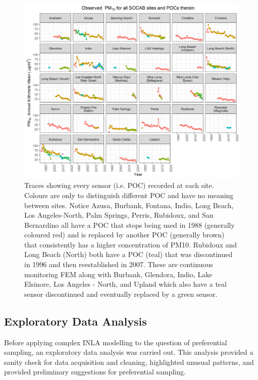\begin{figure}[ht]
\centering
\includegraphics[width = \textwidth]{Figures/POC_all_trace.png}
\caption{Traces showing every sensor (i.e. \ac{POC}) recorded at each site.  Colours are only to distinguish different \ac{POC} and have no meaning between sites.  Notice Azusa, Burbank, Fontana, Indio, Long Beach, Los Angeles-North, Palm Springs, Perris, Rubidoux, and San Bernardino all have a \ac{POC} that stops being used in 1988 (generally coloured red) and is replaced by another \ac{POC} (generally brown) that consistently has a higher concentration of PM10.  Rubidoux and Long Beach (North) both have a \ac{POC} (teal) that was discontinued in 1996 and then reestablished in 2007. These are continuous monitoring \ac{FEM} along with Burbank, Glendora, Indio, Lake Elsinore, Los Angeles - North, and Upland which also have a teal sensor discontinued and eventually replaced by a green sensor.}
\label{fig:POC_all_trace}
\end{figure}

\subsection{Exploratory Data Analysis}
\label{subsec:eda}
Before applying complex INLA modelling to the question of preferential sampling, an exploratory data analysis was carried out.  This analysis provided a sanity check for data acquisition and cleaning, highlighted unusual patterns, and provided preliminary suggestions for preferential sampling.


